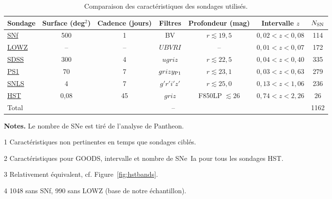 \documentclass[../main/main.tex]{subfiles}
\begin{document}
\begin{table}[ht]
    \centerfloat
    \begin{threeparttable}
        \caption{Comparaison des caractéristiques des sondages utilisés.}
        \label{tab:sondcomp}
        \begin{tabular}{lcccccc}
            \toprule
            Sondage              &
            Surface (deg$^2$)    & Cadence (jours)   & Filtres          &
            Profondeur (mag)     & Intervalle $z$    & $N_{\rm SN}$\\
            \midrule
            \hyperref[ssec:snf]{SNf} &
            500                      & 1                 & BV               &
            $r \lesssim 19,5$        & $0,02 < z < 0,08$ & 114\\
            \hyperref[ssec:lowz]{LOWZ}\tnote{1}            &
            --                       & --                & $UBVRI$          &
            --                       & $0,01 < z < 0,07$ & 172\\
            \hyperref[ssec:sdss]{SDSS}                     &
            300                      & 4                 & $ugriz$          &
            $r \lesssim 22,5$        & $0,04 < z < 0,40$ & 335\\
            \hyperref[ssec:ps1]{PS1}                      &
            70                       & 7                 & $grizy_{\rm P1}$ &
            $r \lesssim 23,1$        & $0,03 < z < 0,63$ & 279\\
            \hyperref[ssec:snls]{SNLS}                     &
            4                        & 7                 & $g'r'i'z'$       &
            $r \lesssim 25,0$        & $0,13 < z < 1,06$ & 236\\
            \hyperref[ssec:hst]{HST}\tnote{2}             &
            0,08                     & 45                & $griz$\tnote{3}  &
            F850LP $\lesssim 26$     & $0,74 < z < 2,26$ & 26\\
            \midrule
            Total & \multicolumn{5}{c}{--} & 1162\tnote{4}\\
            \bottomrule
        \end{tabular}
        \begin{tablenotes}[flushleft]
        \item \textbf{\hspace{-3,2pt}Notes.} Le nombre de SNe est tiré de
            l'analyse de Pantheon.
        \item [1] Caractéristiques non pertinentes en temps que sondages ciblés.
        \item [2] Caractéristiques pour GOODS, intervalle et nombre de SNe~Ia
            pour tous les sondages HST.
        \item [3] Relativement équivalent, cf. Figure~\ref{fig:hstbands}.
        \item [4] 1048 sans SNf, 990 sans LOWZ (base de notre échantillon).
        \end{tablenotes}
    \end{threeparttable}
\end{table}
\end{document}
